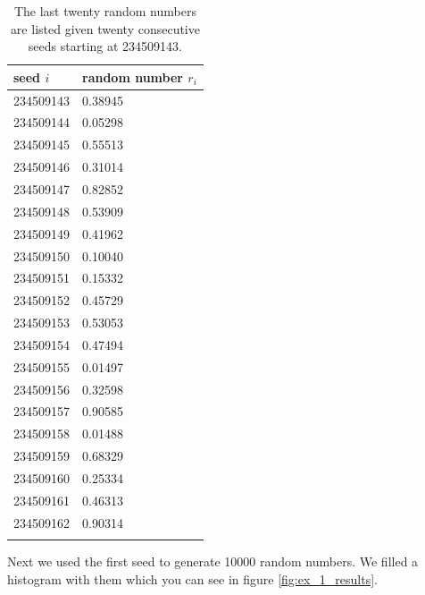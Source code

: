 \documentclass[10pt]{article}
\newenvironment{myfont}{\fontfamily{put}\selectfont}{\par}
\begin{document}
\begin{myfont}
{
\begin{longtable}{*{2}l}
  \caption[]{The last twenty random numbers are listed given twenty consecutive seeds starting at \num{234509143}.}
  \endfirsthead
  \endhead
  \toprule
  \textbf{seed $i$} & \textbf{random number $r_{i}$} \\
  \midrule
  \num{234509143} & \num{0.38945} \\
  \num{234509144} & \num{0.05298} \\
  \num{234509145} & \num{0.55513} \\
  \num{234509146} & \num{0.31014} \\
  \num{234509147} & \num{0.82852} \\
  \num{234509148} & \num{0.53909} \\
  \num{234509149} & \num{0.41962} \\
  \num{234509150} & \num{0.10040} \\
  \num{234509151} & \num{0.15332} \\
  \num{234509152} & \num{0.45729} \\
  \num{234509153} & \num{0.53053} \\
  \num{234509154} & \num{0.47494} \\
  \num{234509155} & \num{0.01497} \\
  \num{234509156} & \num{0.32598} \\
  \num{234509157} & \num{0.90585} \\
  \num{234509158} & \num{0.01488} \\
  \num{234509159} & \num{0.68329} \\
  \num{234509160} & \num{0.25334} \\
  \num{234509161} & \num{0.46313} \\
  \num{234509162} & \num{0.90314} \\
  \bottomrule
  \label{tab:ex_1_results}
\end{longtable}}

\noindent Next we used the first seed to generate \num{10000} random numbers.
We filled a histogram with them which you can see in figure \ref{fig:ex_1_results}.


\end{myfont}
\end{document}
